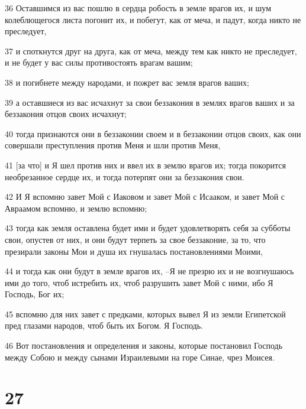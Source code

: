 \par 36 Оставшимся из вас пошлю в сердца робость в земле врагов их, и шум колеблющегося листа погонит их, и побегут, как от меча, и падут, когда никто не преследует,
\par 37 и споткнутся друг на друга, как от меча, между тем как никто не преследует, и не будет у вас силы противостоять врагам вашим;
\par 38 и погибнете между народами, и пожрет вас земля врагов ваших;
\par 39 а оставшиеся из вас исчахнут за свои беззакония в землях врагов ваших и за беззакония отцов своих исчахнут;
\par 40 тогда признаются они в беззаконии своем и в беззаконии отцов своих, как они совершали преступления против Меня и шли против Меня,
\par 41 [за что] и Я шел против них и ввел их в землю врагов их; тогда покорится необрезанное сердце их, и тогда потерпят они за беззакония свои.
\par 42 И Я вспомню завет Мой с Иаковом и завет Мой с Исааком, и завет Мой с Авраамом вспомню, и землю вспомню;
\par 43 тогда как земля оставлена будет ими и будет удовлетворять себя за субботы свои, опустев от них, и они будут терпеть за свое беззаконие, за то, что презирали законы Мои и душа их гнушалась постановлениями Моими,
\par 44 и тогда как они будут в земле врагов их, --Я не презрю их и не возгнушаюсь ими до того, чтоб истребить их, чтоб разрушить завет Мой с ними, ибо Я Господь, Бог их;
\par 45 вспомню для них завет с предками, которых вывел Я из земли Египетской пред глазами народов, чтоб быть их Богом. Я Господь.
\par 46 Вот постановления и определения и законы, которые постановил Господь между Собою и между сынами Израилевыми на горе Синае, чрез Моисея.

\chapter{27}


